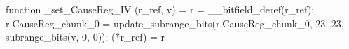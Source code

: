 function _set_CauseReg_IV (r_ref, v) = {
    r = __bitfield_deref(r_ref);
    r.CauseReg_chunk_0 = update_subrange_bits(r.CauseReg_chunk_0, 23, 23, subrange_bits(v, 0, 0));
    (*r_ref) = r
}
